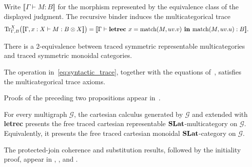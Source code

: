 Write $\llbracket\Gamma\vdash M:B\rrbracket$ for the morphism represented by
the equivalence class of the displayed judgment.  The recursive binder induces
the multicategorical trace
\begin{equation}
\operatorname{Tr}_{\Gamma,B}^{X}
\bigl(\llbracket\Gamma,x:X\vdash M:B\otimes X\rrbracket\bigr)
=
\llbracket
\Gamma\vdash
\textbf{letrec }x=\text{\rm match}(M,uv.v)
\textbf{ in }\text{\rm match}(M,uv.u):B
\rrbracket.
\label{eq:syntactic_trace}
\end{equation}

\begin{proposition}
\label{prop:traced_representable}
There is a $2$-equivalence between traced symmetric representable
multicategories and traced symmetric monoidal categories.
\end{proposition}

\begin{proposition}
\label{prop:trace_construction}
The operation in~\eqref{eq:syntactic_trace}, together with the equations of~, satisfies the multicategorical trace axioms.
\end{proposition}

Proofs of the preceding two propositions appear in~.

\begin{theorem}
\label{theorem:free_traced_slat}
For every multigraph $\mathcal G$, the cartesian calculus generated by $\mathcal G$ and extended with \textbf{letrec} presents the free traced cartesian representable $\mathbf{SLat}$-multicategory on $\mathcal G$.  Equivalently, it presents the free traced cartesian monoidal $\mathbf{SLat}$-category on $\mathcal G$.
\end{theorem}
The protected-join coherence and substitution results, followed by the
initiality proof, appear in
,
,
and .


